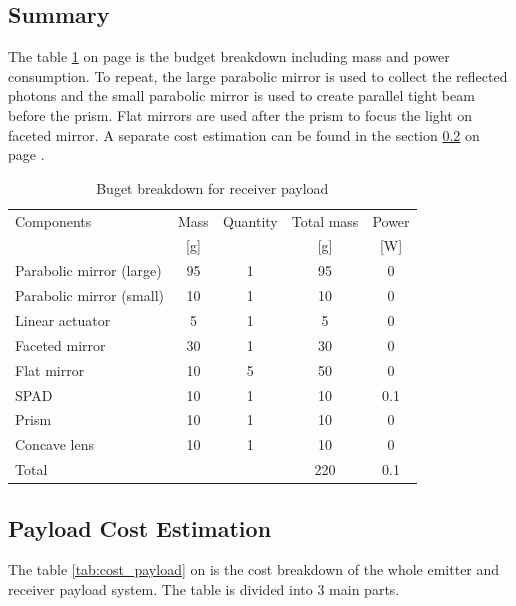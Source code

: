 \subsection{Summary}
\label{sum}
The table \ref{tab:receiverbudget} on page \pageref{tab:receiverbudget} is the budget breakdown including mass and power consumption. To repeat, the large parabolic mirror is used to collect the reflected photons and the small parabolic mirror is used to create parallel tight beam before the prism. Flat mirrors are used after the prism to focus the light on faceted mirror. A separate cost estimation can be found in the section \ref{cost} on page \pageref{cost}.

\begin{table}[ht!]
\centering
\begin{tabular}{l | c | c | c | c }
\hline
Components                & Mass  & Quantity & Total mass & Power\\ 
                          &  [g]  &          &     [g]    &  [W] \\\hline\hline
Parabolic mirror (large)  &  95   &     1    &      95    &   0   \\
Parabolic mirror (small)  &  10   &     1    &     10     &   0   \\
Linear actuator		  &  5    &     1    &     5      &   0   \\
Faceted mirror            &  30   &     1    &     30     &   0   \\ 
Flat mirror               &  10   &     5    &     50     &   0   \\
\acs{SPAD}                &  10   &     1    &     10     &   0.1 \\
Prism                     &  10   &     1    &     10     &   0   \\ 
Concave lens              &  10   &     1    &     10     &   0   \\ \hline
Total                     &       &          &     220    &   0.1 \\\hline
\end{tabular}
\caption{Buget breakdown for receiver payload}
\label{tab:receiverbudget}
\end{table}


\subsection{Payload Cost Estimation}
\label{cost}
The table \ref{tab:cost_payload} on \pageref{tab:cost_payload} is the cost breakdown of the whole emitter and receiver payload system. The table is divided into 3 main parts.

